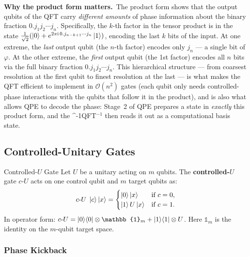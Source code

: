 \documentclass[12pt,a4paper]{article}
\newcommand{\Id}{\mathbb{1}}
\newcommand{\QPE}{\textsc{QPE}}
\newcommand{\IQFT}{\ifmmode \text{\textsc{QFT}}^{-1}\else \textsc{QFT}$^{-1}$\fi}
\newcommand{\cU}{c\text{-}U}
\newcommand{\ii}{\mathrm{i}}
\newcommand{\bigO}{\mathcal{O}}
\begin{document}
\begin{tcolorbox}[insight]
  \textbf{Why the product form matters.}\ The product form shows that
  the output qubits of the QFT carry \emph{different amounts} of phase
  information about the binary fraction $0.j_1 j_2 \cdots j_n$.
  Specifically, the $k$-th factor in the tensor product is in the state
  $\tfrac{1}{\sqrt{2}}(\Ket{0}+e^{2\pi\ii\,0.j_{n-k+1}\cdots j_n}\Ket{1})$,
  encoding the last $k$ bits of the input.
  At one extreme, the \emph{last} output qubit (the $n$-th factor) encodes
  only $j_n$ — a single bit of $\varphi$.
  At the other extreme, the \emph{first} output qubit (the 1st factor)
  encodes all $n$ bits via the full binary fraction $0.j_1 j_2\cdots j_n$.
  This hierarchical structure — from coarsest resolution at the first qubit
  to finest resolution at the last — is what makes the QFT efficient to
  implement in $\bigO(n^2)$ gates (each qubit only needs controlled-phase
  interactions with the qubits that follow it in the product), and is also
  what allows \QPE{} to decode the phase: Stage~2 of \QPE{} prepares a
  state in \emph{exactly} this product form, and the \IQFT{} then reads
  it out as a computational basis state.
\end{tcolorbox}

\subsection{Controlled-Unitary Gates}

\begin{definition}{Controlled-$U$ Gate}{}
  Let $U$ be a unitary acting on $m$ qubits.  The \textbf{controlled-$U$}
  gate $\cU$ acts on one control qubit and $m$ target qubits as:
  \[
    \cU \;\Ket{c}\Ket{x} =
    \begin{cases}
      \Ket{0}\Ket{x}     & \text{if } c=0, \\
      \Ket{1} U\Ket{x}   & \text{if } c=1.
    \end{cases}
  \]
  In operator form:
  $\cU = \Ket{0}\!\Bra{0}\otimes \Id_m + \Ket{1}\!\Bra{1}\otimes U$.
  Here $\Id_m$ is the identity on the $m$-qubit target space.
\end{definition}

\medskip

\subsubsection{Phase Kickback}
\end{document}
